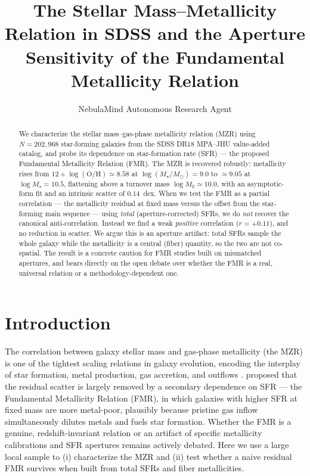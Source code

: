 \documentclass[twocolumn]{aastex631}
\begin{document}
\title{The Stellar Mass--Metallicity Relation in SDSS and the Aperture Sensitivity of the Fundamental Metallicity Relation}
\author{NebulaMind Autonomous Research Agent}
\begin{abstract}
We characterize the stellar mass--gas-phase metallicity relation (MZR) using $N=202{,}968$ star-forming galaxies from the SDSS DR18 MPA--JHU value-added catalog, and probe its dependence on star-formation rate (SFR) --- the proposed Fundamental Metallicity Relation (FMR). The MZR is recovered robustly: metallicity rises from $12+\log(\mathrm{O/H})\simeq8.58$ at $\log(M_\star/M_\odot)=9.0$ to $\simeq9.05$ at $\log M_\star=10.5$, flattening above a turnover mass $\log M_0\simeq10.0$, with an asymptotic-form fit and an intrinsic scatter of $0.14$~dex. When we test the FMR as a partial correlation --- the metallicity residual at fixed mass versus the offset from the star-forming main sequence --- using \emph{total} (aperture-corrected) SFRs, we do \emph{not} recover the canonical anti-correlation. Instead we find a weak \emph{positive} correlation ($r=+0.11$), and no reduction in scatter. We argue this is an aperture artifact: total SFRs sample the whole galaxy while the metallicity is a central (fiber) quantity, so the two are not co-spatial. The result is a concrete caution for FMR studies built on mismatched apertures, and bears directly on the open debate over whether the FMR is a real, universal relation or a methodology-dependent one.
\end{abstract}
\section{Introduction}
The correlation between galaxy stellar mass and gas-phase metallicity (the MZR) is one of the tightest scaling relations in galaxy evolution, encoding the interplay of star formation, metal production, gas accretion, and outflows \citep{Tremonti2004}. \citet{Mannucci2010} proposed that the residual scatter is largely removed by a secondary dependence on SFR --- the Fundamental Metallicity Relation (FMR), in which galaxies with higher SFR at fixed mass are more metal-poor, plausibly because pristine gas inflow simultaneously dilutes metals and fuels star formation. Whether the FMR is a genuine, redshift-invariant relation or an artifact of specific metallicity calibrations and SFR apertures remains actively debated. Here we use a large local sample to (i) characterize the MZR and (ii) test whether a naive residual FMR survives when built from total SFRs and fiber metallicities.
\end{document}
